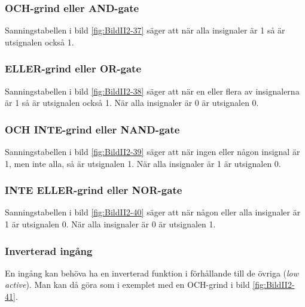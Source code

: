 \subsubsection{OCH-grind eller AND-gate}


Sanningstabellen i bild \ref{fig:BildII2-37} säger att när alla insignaler
är 1 så är utsignalen också 1.

\subsubsection{ELLER-grind eller OR-gate}


Sanningstabellen i bild \ref{fig:BildII2-38} säger att när en eller flera av
insignalerna är 1 så är utsignalen också 1.
När alla insignaler är 0 är utsignalen 0.

\subsubsection{OCH INTE-grind eller NAND-gate}


Sanningstabellen i bild \ref{fig:BildII2-39} säger att när ingen eller någon
insignal är 1, men inte alla, så är utsignalen 1.
När alla insignaler är 1 är utsignalen 0.

\subsubsection{INTE ELLER-grind eller NOR-gate}


Sanningstabellen i bild \ref{fig:BildII2-40} säger att när någon eller alla
insignaler är 1 är utsignalen 0.
När alla insignaler är 0 är utsignalen 1.

\subsubsection{Inverterad ingång}

En ingång kan behöva ha en inverterad funktion i förhållande till de övriga
(\emph{low active}).
Man kan då göra som i exemplet med en OCH-grind i bild \ref{fig:BildII2-41}.

